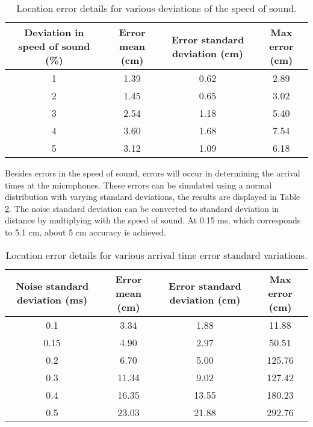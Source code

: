 \documentclass[final]{scrreprt} %
\begin{document}
\begin{table} [H]
\centering
	\begin{tabular}{ c | c | c | c }
  	Deviation in speed of sound (\%) & Error mean (cm) & Error standard deviation (cm) & Max error (cm) \\ \hline
  	1 & 1.39 & 0.62 & 2.89 \\
	2 & 1.45 & 0.65 & 3.02 \\
	3 & 2.54 & 1.18 & 5.40 \\
	4 & 3.60 & 1.68 & 7.54 \\
  	5 & 3.12 & 1.09 & 6.18 \\
	\end{tabular}
\caption{Location error details for various deviations of the speed of sound.}
\label{tab:c-errors}
\end{table}

Besides errors in the speed of sound, errors will occur in determining the arrival times at the microphones.
These errors can be simulated using a normal distribution with varying standard deviations, the results are displayed in Table \ref{tab:std-errors}.
The noise standard deviation can be converted to standard deviation in distance by multiplying with the speed of sound.
At 0.15 ms, which corresponds to 5.1 cm, about 5 cm accuracy is achieved.

\begin{table} [H]
\centering
	\begin{tabular}{ c | c | c | c }
  	Noise standard deviation (ms) & Error mean (cm) & Error standard deviation (cm) & Max error (cm) \\ \hline
	0.1 & 3.34 & 1.88 & 11.88 \\
	0.15 & 4.90 & 2.97 & 50.51 \\
	0.2 & 6.70 & 5.00 & 125.76 \\
	0.3 & 11.34 & 9.02 & 127.42 \\
	0.4 & 16.35 & 13.55 & 180.23 \\
	0.5 & 23.03 & 21.88 & 292.76 \\
	\end{tabular}
\caption{Location error details for various arrival time error standard variations.}
\label{tab:std-errors}
\end{table}
\end{document}
